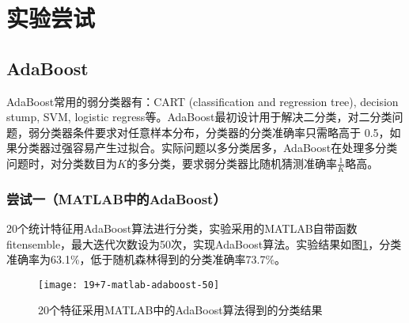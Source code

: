 \section{实验尝试}
%
\subsection{AdaBoost}
AdaBoost常用的弱分类器有：CART (classification and regression tree), decision stump, SVM, logistic regress等。AdaBoost最初设计用于解决二分类，对二分类问题，弱分类器条件要求对任意样本分布，分类器的分类准确率只需略高于 0.5，如果分类器过强容易产生过拟合。实际问题以多分类居多，AdaBoost在处理多分类问题时，对分类数目为$K$的多分类，要求弱分类器比随机猜测准确率$\frac{1}{K}$略高。

\subsubsection{尝试一（MATLAB中的AdaBoost）}
20个统计特征用AdaBoost算法进行分类，实验采用的MATLAB自带函数fitensemble，最大迭代次数设为50次，实现AdaBoost算法。实验结果如图\ref{fig:19+7-matlab-adaboost-50}，分类准确率为63.1\%，低于随机森林得到的分类准确率73.7\%。
\begin{figure}[!ht]
\centering
\texttt{[image: 19+7-matlab-adaboost-50]}
\caption{20个特征采用MATLAB中的AdaBoost算法得到的分类结果}
\label{fig:19+7-matlab-adaboost-50}
\end{figure}

